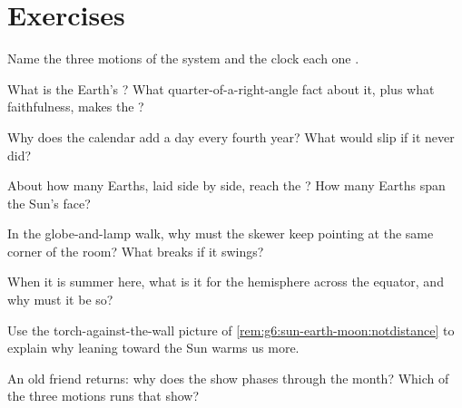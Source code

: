 \section{Exercises}

\begin{exercise}[$\star$]\label{exo:g6:sun-earth-moon:1}
Name the three motions of the system and the clock each one
.
\end{exercise}

\begin{exercise}[$\star$]\label{exo:g6:sun-earth-moon:2}
What is the Earth's ? What quarter-of-a-right-angle fact about
it, plus what faithfulness, makes the ?
\end{exercise}

\begin{exercise}[$\star$]\label{exo:g6:sun-earth-moon:3}
Why does the calendar add a day every fourth year? What would slip
if it never did?
\end{exercise}

\begin{exercise}[$\star$]\label{exo:g6:sun-earth-moon:4}
About how many Earths, laid side by side, reach the ? How
many Earths span the Sun's face?
\end{exercise}

\begin{exercise}[$\star$]\label{exo:g6:sun-earth-moon:5}
In the globe-and-lamp walk, why must the skewer keep pointing at
the same corner of the room? What breaks if it swings?
\end{exercise}

\begin{exercise}[$\star$]\label{exo:g6:sun-earth-moon:6}
When it is summer here, what  is it for the hemisphere
across the equator, and why must it be so?
\end{exercise}

\begin{exercise}[$\star$]\label{exo:g6:sun-earth-moon:7}
Use the torch-against-the-wall picture of
\cref{rem:g6:sun-earth-moon:notdistance} to explain why leaning
toward the Sun warms us more.
\end{exercise}

\begin{exercise}[$\star$]\label{exo:g6:sun-earth-moon:8}
An old friend returns: why does the  show phases through the
month? Which of the three motions runs that show?
\end{exercise}

